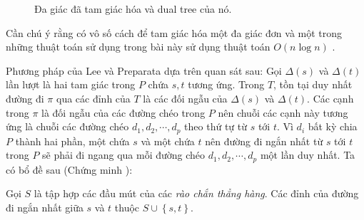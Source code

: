 \begin{figure}[h]
  \caption{Đa giác đã tam giác hóa và dual tree của nó.}
  \label{fig:1} %
\end{figure} 






Cần chú ý rằng có vô số cách để tam giác hóa một đa giác đơn và một trong những thuật toán sử dụng trong bài này sử dụng thuật toán $O\left(n \log n\right)$ \cite{Triangulate_nlogn}.

Phương pháp của Lee và Preparata dựa trên quan sát sau: Gọi $\Delta (s)$ và $\Delta (t)$ lần lượt là hai tam giác trong $P$ chứa $s, t$ tương ứng. Trong $T$, tồn tại duy nhất đường đi $\pi$ qua các đỉnh của $T$ là các đối ngẫu của $\Delta (s)$ và $\Delta (t)$. Các cạnh trong $\pi$ là đối ngẫu của các đường chéo trong $P$ nên chuỗi các cạnh này tương ứng là chuỗi các đường chéo $d_1, d_2, \cdots,d_p$ theo thứ tự từ $s$ tới $t$. Vì $d_i$ bất kỳ chia $P$ thành hai phần, một chứa $s$ và một chứa $t$ nên đường đi ngắn nhất từ $s$ tới $t$ trong $P$ sẽ phải đi ngang qua mỗi đường chéo $d_1, d_2, \cdots,d_p$ một lần duy nhất. Ta có bổ đề sau (Chứng minh \cite{Lee_paper_proof_lemma_1}):

\begin{lemma}
    Gọi $S$ là tập hợp các đầu mút của các \textit{rào chắn thẳng hàng}. Các đỉnh của đường đi ngắn nhất giữa $s$ và $t$ thuộc $S\cup \left\{s,t\right\}.$
\end{lemma}

